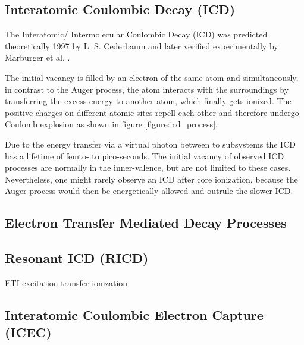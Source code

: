 \subsection{Interatomic Coulombic Decay (ICD)}
The Interatomic/ Intermolecular Coulombic Decay (ICD) was predicted
theoretically 1997 by L. S. Cederbaum \cite{Cederbaum97}
and later verified experimentally by Marburger et al. \cite{Marbuger03}.

The initial vacancy is filled by an electron of the same atom and simultaneously,
in contrast to the Auger process, the atom interacts with the surroundings by
transferring the excess energy to another atom, which finally gets ionized. The
positive charges on different atomic sites repell each other and therefore undergo
Coulomb explosion as shown in figure \ref{figure:icd_process}.

\begin{figure}
\end{figure}

Due to the energy transfer via a virtual photon between to subsystems
the ICD has a lifetime of femto- to pico-seconds.
The initial vacancy of observed ICD processes are normally in the inner-valence,
but are not limited to these cases. Nevertheless, one might rarely observe
an ICD after core ionization, because the Auger process would then be energetically
allowed and outrule the slower ICD.

\subsection{Electron Transfer Mediated Decay Processes}
\subsection{Resonant ICD (RICD)}
ETI excitation transfer ionization
\subsection{Interatomic Coulombic Electron Capture (ICEC)}
